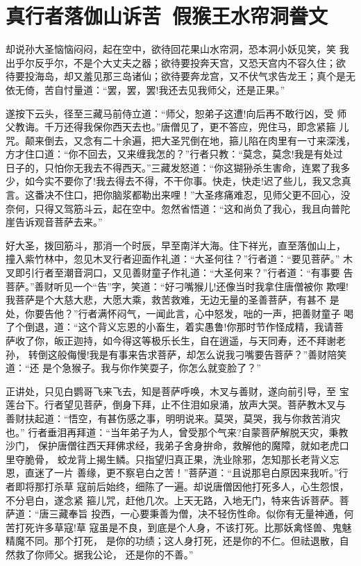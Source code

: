 \chapter{真行者落伽山诉苦~假猴王水帘洞誊文}

却说孙大圣恼恼闷闷，起在空中，欲待回花果山水帘洞，恐本洞小妖见笑，笑
我出乎尔反乎尔，不是个大丈夫之器；欲待要投奔天宫，又恐天宫内不容久住；欲
待要投海岛，却又羞见那三岛诸仙；欲待要奔龙宫，又不伏气求告龙王；真个是无
依无倚，苦自忖量道：“罢，罢，罢!我还去见我师父，还是正果。”

遂按下云头，径至三藏马前侍立道：“师父，恕弟子这遭!向后再不敢行凶，受
师父教诲。千万还得我保你西天去也。”唐僧见了，更不答应，兜住马，即念紧箍
儿咒。颠来倒去，又念有二十余遍，把大圣咒倒在地，箍儿陷在肉里有一寸来深浅，
方才住口道：“你不回去，又来缠我怎的？”行者只教：“莫念，莫念!我是有处过
日子的，只怕你无我去不得西天。”三藏发怒道：“你这猢狲杀生害命，连累了我多
少，如今实不要你了!我去得去不得，不干你事。快走，快走!迟了些儿，我又念真
言。这番决不住口，把你脑浆都勒出来哩！”大圣疼痛难忍，见师父更不回心，没
奈何，只得又驾筋斗云，起在空中。忽然省悟道：“这和尚负了我心，我且向普陀
崖告诉观音菩萨去来。”

好大圣，拨回筋斗，那消一个时辰，早至南洋大海。住下祥光，直至落伽山上，
撞入紫竹林中，忽见木叉行者迎面作礼道：“大圣何往？”行者道：“要见菩萨。”
木叉即引行者至潮音洞口，又见善财童子作礼道：“大圣何来？”行者道：“有事要
告菩萨。”善财听见一个“告”字，笑道：“好刁嘴猴儿!还像当时我拿住唐僧被你
欺哩!我菩萨是个大慈大悲，大愿大乘，救苦救难，无边无量的圣善菩萨，有甚不
是处，你要告他？”行者满怀闷气，一闻此言，心中怒发，咄的一声，把善财童子
喝了个倒退，道：“这个背义忘恩的小畜生，着实愚鲁!你那时节作怪成精，我请菩
萨收了你，皈正迦持，如今得这等极乐长生，自在逍遥，与天同寿，还不拜谢老孙，
转倒这般侮慢!我是有事来告求菩萨，却怎么说我刁嘴要告菩萨？”善财陪笑道：“还
是个急猴子。我与你作笑耍子，你怎么就变脸了？”

正讲处，只见白鹦哥飞来飞去，知是菩萨呼唤，木叉与善财，遂向前引导，至
宝莲台下。行者望见菩萨，倒身下拜，止不住泪如泉涌，放声大哭。菩萨教木叉与
善财扶起道：“悟空，有甚伤感之事，明明说来。莫哭，莫哭，我与你救苦消灾也。”
行者垂泪再拜道：“当年弟子为人，曾受那个气来?自蒙菩萨解脱天灾，秉教沙门，
保护唐僧往西天拜佛求经，我弟子舍身拚命，救解他的魔障，就如老虎口里夺脆骨，
蛟龙背上揭生鳞。只指望归真正果，洗业除邪，怎知那长老背义忘恩，直迷了一片
善缘，更不察皂白之苦！”菩萨道：“且说那皂白原因来我听。”行者即将那打杀草
寇前后始终，细陈了一遍。却说唐僧因他打死多人，心生怨恨，不分皂白，遂念紧
箍儿咒，赶他几次。上天无路，入地无门，特来告诉菩萨。菩萨道：“唐三藏奉旨
投西，一心要秉善为僧，决不轻伤性命。似你有无量神通，何苦打死许多草寇!草
寇虽是不良，到底是个人身，不该打死。比那妖禽怪兽、鬼魅精魔不同。那个打死，
是你的功绩；这人身打死，还是你的不仁。但祛退散，自然救了你师父。据我公论，
还是你的不善。”


